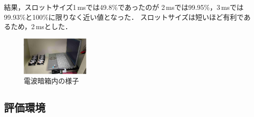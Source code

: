 \documentclass[technicalreport]{ieicej}
\begin{document}
結果，スロットサイズ1\,msでは49.8\%であったのが
2\,msでは99.95\%，3\,msでは99.93\%と100\%に限りなく近い値となった．
スロットサイズは短いほど有利であるため，2\,msとした．

\begin{figure}[bt]
 \centering
 \includegraphics[width=0.3\textwidth]{figure/nowave_box.pdf}
 \caption{電波暗箱内の様子}
 \label{fig:nowave_box}
\end{figure}

\subsection{評価環境}
\end{document}
